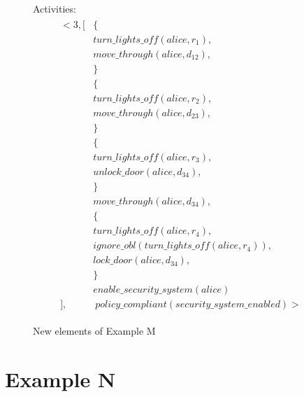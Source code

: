 \begin{figure}[H]
    \begin{framed}
        Activities:
        \begin{gather}
        \begin{split}
            <3, [
                & \{ \\
                    & turn\_lights\_off(alice, r_1), \\
                    & move\_through(alice, d_{12}), \\
                & \} \\
                & \{ \\
                    & turn\_lights\_off(alice, r_{2}), \\
                    & move\_through(alice, d_{23}), \\
                & \} \\
                & \{ \\
                    & turn\_lights\_off(alice, r_{3}), \\
                    & unlock\_door(alice, d_{34}), \\
                & \} \\
                & move\_through(alice, d_{34}), \\
                & \{ \\
                    & turn\_lights\_off(alice, r_{4}), \\
                    & ignore\_obl(turn\_lights\_off(alice, r_{4})), \\
                    & lock\_door(alice, d_{34}), \\
                & \} \\
                & enable\_security\_system(alice) \\
            ], & \ policy\_compliant(security\_system\_enabled)>
        \end{split}
        \end{gather}
    \end{framed}
    \caption{New elements of Example M}
    \label{fig:apia_example_m_description}
\end{figure}

\section{Example N}


